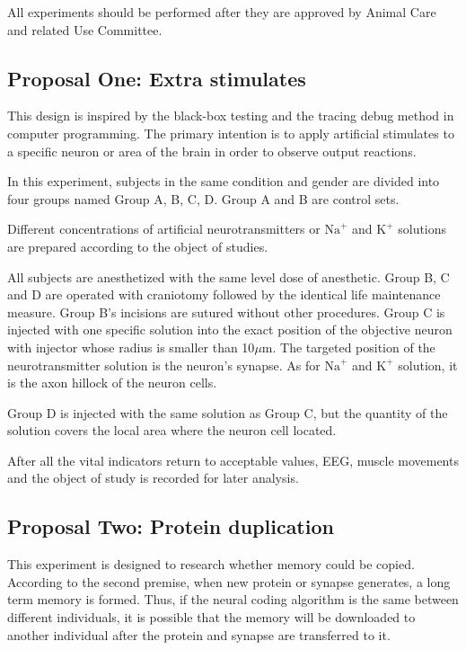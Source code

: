 \documentclass[conference]{IEEEtran}
\begin{document}
All experiments should be performed after they are approved by Animal Care and related Use Committee.

\subsection{Proposal One: Extra stimulates}

This design is inspired by the black-box testing and the tracing debug method in computer programming. The primary intention is to apply artificial stimulates to a specific neuron or area of the brain in order to observe output reactions.

In this experiment, subjects in the same condition and gender are divided into four groups named Group A, B, C, D. Group A and B are control sets.

Different concentrations of artificial neurotransmitters or $\text{Na}^{+}$ and $\text{K}^{+}$ solutions are prepared according to the object of studies. 

All subjects are anesthetized with the same level dose of anesthetic. Group B, C and D are operated with craniotomy followed by the identical life maintenance measure. Group B's incisions are sutured without other procedures. Group C is injected with one specific solution into the exact position of the objective neuron with injector whose radius is smaller than 10$\mu$m. The targeted position of the neurotransmitter solution is the neuron's synapse. As for $\text{Na}^{+}$ and $\text{K}^{+}$ solution, it is the axon hillock of the neuron cells.

Group D is injected with the same solution as Group C, but the quantity of the solution covers the local area where the neuron cell located.

After all the vital indicators return to acceptable values, EEG, muscle movements and the object of study is recorded for later analysis.

\subsection{Proposal Two: Protein duplication}

This experiment is designed to research whether memory could be copied. According to the second premise,  when new protein or synapse generates, a long term memory is formed. Thus, if the neural coding algorithm is the same between different individuals, it is possible that the memory will be downloaded to another  individual after the protein and synapse are transferred to it.
\end{document}
